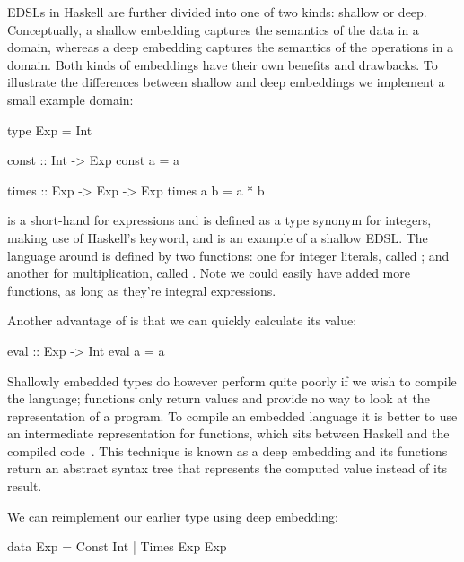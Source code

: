 \documentclass[../paper.tex]{subfiles}
\begin{document}

EDSLs in Haskell are further divided into one of two kinds: shallow or deep. Conceptually, a shallow embedding captures the semantics of the data in a domain, whereas a deep embedding captures the semantics of the operations in a domain. Both kinds of embeddings have their own benefits and drawbacks. To illustrate the differences between shallow and deep embeddings we implement a small example domain:


\begin{code}
type Exp = Int

const :: Int -> Exp
const a = a

times :: Exp -> Exp -> Exp
times a b = a * b
\end{code}

\noindent {} is a short-hand for expressions and is defined as a type synonym for integers, making use of Haskell's  keyword, and is an example of a shallow EDSL. The language around  is defined by two functions: one for integer literals, called ; and another for multiplication, called . Note we could easily have added more functions, as long as they're integral expressions.

Another advantage of  is that we can quickly calculate its value:

\begin{code}
eval :: Exp -> Int
eval a = a
\end{code}

\noindent Shallowly embedded types do however perform quite poorly if we wish to compile the language; functions only return values and provide no way to look at the representation of a program. To compile an embedded language it is better to use an intermediate representation for functions, which sits between Haskell and the compiled code~\cite{elliott2003}. This technique is known as a deep embedding and its functions return an abstract syntax tree that represents the computed value instead of its result.

We can reimplement our earlier  type using deep embedding:

\begin{code}
data Exp = Const Int | Times Exp Exp
\end{code}
\end{document}
